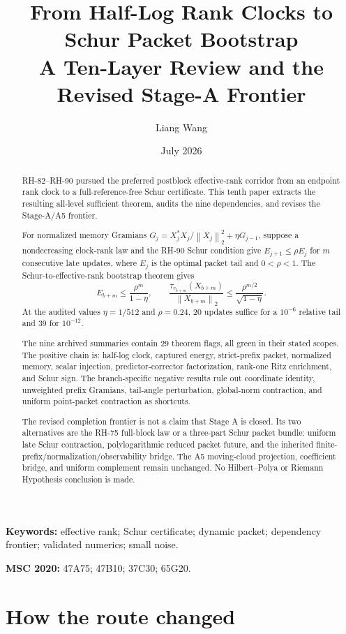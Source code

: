 \documentclass[11pt]{article}
\title{From Half-Log Rank Clocks to Schur Packet Bootstrap\\
\large A Ten-Layer Review and the Revised Stage-A Frontier}
\author{Liang Wang}
\date{July 2026}
\theoremstyle{remark}
\newcommand{\norm}[1]{\left\lVert#1\right\rVert}
\begin{document}
\maketitle

\begin{abstract}
RH-82--RH-90 pursued the preferred postblock effective-rank corridor from an
endpoint rank clock to a full-reference-free Schur certificate.  This tenth
paper extracts the resulting all-level sufficient theorem, audits the nine
dependencies, and revises the Stage-A/A5 frontier.

For normalized memory Gramians
$G_j=X_j^*X_j/\norm{X_j}_2^2+\eta G_{j-1}$, suppose a nondecreasing
clock-rank law and the RH-90 Schur condition give
$E_{j+1}\le\rho E_j$ for $m$ consecutive late updates, where $E_j$ is the
optimal packet tail and $0<\rho<1$.  The Schur-to-effective-rank bootstrap
theorem gives
\[
 E_{b+m}\le\frac{\rho^m}{1-\eta},\qquad
 \frac{\tau_{r_{b+m}}(X_{b+m})}{\norm{X_{b+m}}_2}
 \le\frac{\rho^{m/2}}{\sqrt{1-\eta}}.
\]
At the audited values $\eta=1/512$ and $\rho=0.24$, 20 updates suffice for a
$10^{-6}$ relative tail and 39 for $10^{-12}$.

The nine archived summaries contain 29 theorem flags, all green in their
stated scopes.  The positive chain is: half-log clock, captured energy,
strict-prefix packet, normalized memory, scalar injection, predictor-corrector
factorization, rank-one Ritz enrichment, and Schur sign.  The branch-specific
negative results rule out coordinate identity, unweighted prefix Gramians,
tail-angle perturbation, global-norm contraction, and uniform point-packet
contraction as shortcuts.

The revised completion frontier is not a claim that Stage A is closed.  Its
two alternatives are the RH-75 full-block law or a three-part Schur packet
bundle: uniform late Schur contraction, polylogarithmic reduced packet future,
and the inherited finite-prefix/normalization/observability bridge.  The A5
moving-cloud projection, coefficient bridge, and uniform complement remain
unchanged.  No Hilbert--Polya or Riemann Hypothesis conclusion is made.
\end{abstract}

\noindent\textbf{Keywords:} effective rank; Schur certificate; dynamic
packet; dependency frontier; validated numerics; small noise.

\medskip
\noindent\textbf{MSC 2020:} 47A75; 47B10; 37C30; 65G20.

\section{How the route changed}
\end{document}
